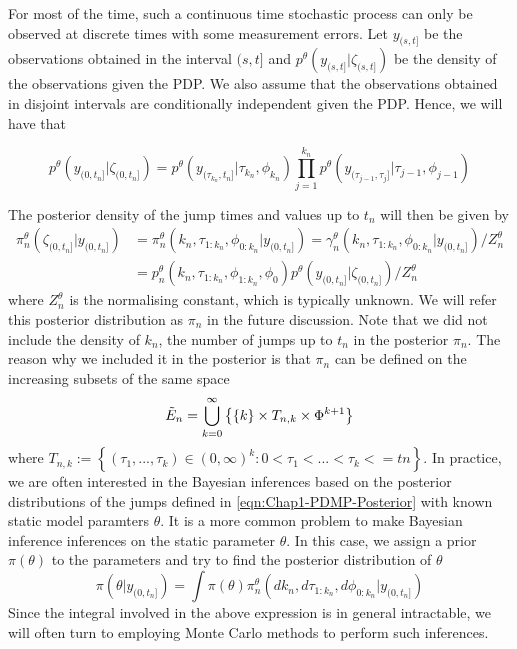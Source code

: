 \documentclass[12pt,a4paper]{article}
\begin{document}
For most of the time, such a continuous time stochastic process can only be observed at discrete times with some measurement errors. Let $y_{(s,t]}$ be the observations obtained in the interval $(s,t]$ and $p^{\theta}(y_{(s,t]}|\zeta_{(s,t]})$ be the density of the observations given the PDP. We also assume that the observations obtained in disjoint intervals are conditionally independent given the PDP. Hence, we will have that 

\begin{equation}
\label{eqn:Chap1-PDMP-Likelihood}
    p^{\theta}(y_{(0,t_n]}|\zeta_{(0,t_n]}) = p^{\theta}(y_{(\tau_{k_n},t_n]}|\tau_{k_n},\phi_{k_n}) \prod_{j=1}^{k_n} p^{\theta}(y_{(\tau_{j-1},\tau_j]}|\tau_{j-1},\phi_{j-1})
\end{equation}


The posterior density of the jump times and values up to $t_n$ will then be given by 
\begin{equation}
\label{eqn:Chap1-PDMP-Posterior}
	\begin{split}
		 \pi_n^{\theta}(\zeta_{(0,t_n]}|y_{(0,t_n]}) &= \pi_n^{\theta}(k_n,\tau_{1:k_n},\phi_{0:k_n}|y_{(0,t_n]}) = \gamma_{n}^{\theta}(k_n,\tau_{1:k_n},\phi_{0:k_n}|y_{(0,t_n]})/Z_n^{\theta}\\
		 &=p_n^{\theta}(k_n,\tau_{1:k_n},\phi_{1:k_n},\phi_0)  p^{\theta}(y_{(0,t_n]}|\zeta_{(0,t_n]}) / Z_n^{\theta}		
	\end{split} 
\end{equation}
where $Z_n^{\theta}$ is the normalising constant, which is typically unknown. We will refer this posterior distribution as $\pi_n$ in the future discussion. Note that we did not include the density of $k_n$, the number of jumps up to $t_n$ in the posterior $\pi_n$. The reason why we included it in the posterior is that $\pi_n$ can be defined on the increasing subsets of the same space 
\begin{equation*}
    \Tilde{E}_n = \bigcup_{k=0}^{\infty} \left\{\{k\}\times T_{n,k} \times \Phi^{k+1}\right\}
\end{equation*}
where $T_{n,k} := \left\{(\tau_1,...,\tau_k) \in (0,\infty)^k : 0 < \tau_1 <...< \tau_k <= tn\right\}$. In practice, we are often interested in the Bayesian inferences based on the posterior distributions of the jumps defined in \eqref{eqn:Chap1-PDMP-Posterior} with known static model paramters \(\theta\). It is a more common problem to make Bayesian inference inferences on the static parameter \(\theta\). In this case, we assign a prior \(\pi(\theta)\) to the parameters and try to find the posterior distribution of \(\theta\)
\[
  \pi(\theta|y_{(0,t_n]}) = \int \pi(\theta)\pi_n^{\theta}(dk_n,d\tau_{1:k_n},d\phi_{0:k_n}|y_{(0,t_n]})  
\]
Since the integral involved in the above expression is in general intractable, we will often turn to employing Monte Carlo methods to perform such inferences. 
\end{document}
